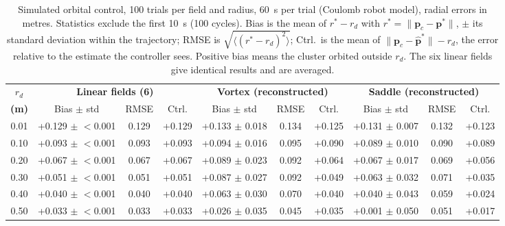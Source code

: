 \begin{table}[!t]
\centering
\footnotesize
\caption{Simulated orbital control, 100 trials per field and radius, 60~s per trial (Coulomb robot model), radial errors in metres. Statistics exclude the first 10~s (100 cycles). Bias is the mean of $r^* - r_d$ with $r^* = \|\mathbf{p}_c - \mathbf{p}^*\|$, $\pm$ its standard deviation within the trajectory; RMSE is $\sqrt{\langle (r^* - r_d)^2 \rangle}$; Ctrl.\ is the mean of $\|\mathbf{p}_c - \hat{\mathbf{p}}^*\| - r_d$, the error relative to the estimate the controller sees. Positive bias means the cluster orbited outside $r_d$. The six linear fields give identical results and are averaged.}
\label{tab:simulation_orbital_results}
\setlength{\tabcolsep}{3pt}
\begin{tabular}{c|ccc|ccc|ccc}
\hline
\textbf{$r_d$} & \multicolumn{3}{c|}{\textbf{Linear fields (6)}} & \multicolumn{3}{c|}{\textbf{Vortex (reconstructed)}} & \multicolumn{3}{c}{\textbf{Saddle (reconstructed)}} \\
\textbf{(m)} & Bias $\pm$ std & RMSE & Ctrl. & Bias $\pm$ std & RMSE & Ctrl. & Bias $\pm$ std & RMSE & Ctrl. \\
\hline
0.01 & +0.129 $\pm$ $<$0.001 & 0.129 & +0.129 & +0.133 $\pm$ 0.018 & 0.134 & +0.125 & +0.131 $\pm$ 0.007 & 0.132 & +0.123 \\
0.10 & +0.093 $\pm$ $<$0.001 & 0.093 & +0.093 & +0.094 $\pm$ 0.016 & 0.095 & +0.090 & +0.089 $\pm$ 0.010 & 0.090 & +0.089 \\
0.20 & +0.067 $\pm$ $<$0.001 & 0.067 & +0.067 & +0.089 $\pm$ 0.023 & 0.092 & +0.064 & +0.067 $\pm$ 0.017 & 0.069 & +0.056 \\
0.30 & +0.051 $\pm$ $<$0.001 & 0.051 & +0.051 & +0.087 $\pm$ 0.027 & 0.092 & +0.049 & +0.063 $\pm$ 0.032 & 0.071 & +0.035 \\
0.40 & +0.040 $\pm$ $<$0.001 & 0.040 & +0.040 & +0.063 $\pm$ 0.030 & 0.070 & +0.040 & +0.040 $\pm$ 0.043 & 0.059 & +0.024 \\
0.50 & +0.033 $\pm$ $<$0.001 & 0.033 & +0.033 & +0.026 $\pm$ 0.035 & 0.045 & +0.035 & +0.001 $\pm$ 0.050 & 0.051 & +0.017 \\
\hline
\end{tabular}
\end{table}
